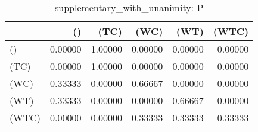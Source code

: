 \begin{table}
\centering
\caption{supplementary_with_unanimity: P}
\begin{tabular}{lrrrrr}
\toprule
{} &      () &    (TC) &    (WC) &    (WT) &   (WTC) \\
\midrule
()    & 0.00000 & 1.00000 & 0.00000 & 0.00000 & 0.00000 \\
(TC)  & 0.00000 & 1.00000 & 0.00000 & 0.00000 & 0.00000 \\
(WC)  & 0.33333 & 0.00000 & 0.66667 & 0.00000 & 0.00000 \\
(WT)  & 0.33333 & 0.00000 & 0.00000 & 0.66667 & 0.00000 \\
(WTC) & 0.00000 & 0.00000 & 0.33333 & 0.33333 & 0.33333 \\
\bottomrule
\end{tabular}
\end{table}

